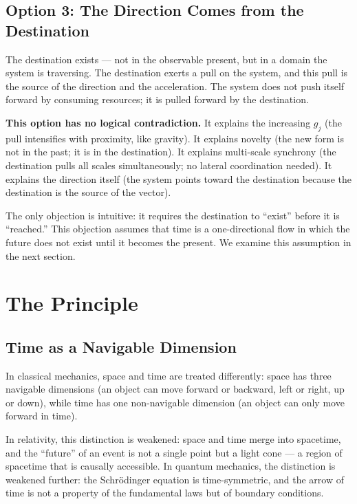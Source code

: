 \documentclass[12pt,a4paper]{article}
\newcommand{\gj}{g_j}
\begin{document}
\subsection{Option 3: The Direction Comes from the Destination}

The destination exists --- not in the observable present, but in a domain the system is traversing. The destination exerts a pull on the system, and this pull is the source of the direction and the acceleration. The system does not push itself forward by consuming resources; it is pulled forward by the destination.

\textbf{This option has no logical contradiction.} It explains the increasing $\gj$ (the pull intensifies with proximity, like gravity). It explains novelty (the new form is not in the past; it is in the destination). It explains multi-scale synchrony (the destination pulls all scales simultaneously; no lateral coordination needed). It explains the direction itself (the system points toward the destination because the destination is the source of the vector).

The only objection is intuitive: it requires the destination to ``exist'' before it is ``reached.'' This objection assumes that time is a one-directional flow in which the future does not exist until it becomes the present. We examine this assumption in the next section.


\section{The Principle}

\subsection{Time as a Navigable Dimension}

In classical mechanics, space and time are treated differently: space has three navigable dimensions (an object can move forward or backward, left or right, up or down), while time has one non-navigable dimension (an object can only move forward in time).

In relativity, this distinction is weakened: space and time merge into spacetime, and the ``future'' of an event is not a single point but a light cone --- a region of spacetime that is causally accessible. In quantum mechanics, the distinction is weakened further: the Schr\"odinger equation is time-symmetric, and the arrow of time is not a property of the fundamental laws but of boundary conditions.
\end{document}
